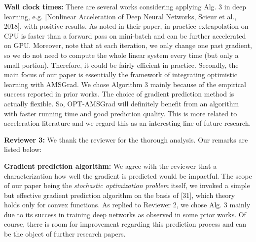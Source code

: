 \documentclass{article}
\begin{document}
\textbf{Wall clock times:}
There are several works considering applying Alg. 3 in deep learning, e.g. [Nonlinear Acceleration of Deep Neural Networks, Scieur et al., 2018], with positive results. As noted in their paper, in practice extrapolation on CPU is faster than a forward pass on mini-batch and can be further accelerated on GPU. Moreover, note that at each iteration, we only change one past gradient, so we do not need to compute the whole linear system every time (but only a small portion).  Therefore, it could be fairly efficient in practice. Secondly, the main focus of our paper is essentially the framework of integrating optimistic learning with AMSGrad. We chose Algorithm 3 mainly because of the empirical success reported in prior works. The choice of gradient prediction method is actually flexible. So, OPT-AMSGrad will definitely benefit from an algorithm with faster running time and good prediction quality. This is more related to acceleration literature and we regard this as an interesting line of future research.\vspace{-5pt}


\vspace{0.05in}
\textbf{\textcolor{green!50!black}{Reviewer 3:}} We thank the reviewer for the thorough analysis. Our remarks are listed below:\vspace{-5pt}

\textbf{Gradient prediction algorithm:}
We agree with the reviewer that a characterization how well the gradient is predicted would be impactful.
The scope of our paper being the \emph{stochastic optimization problem} itself, we invoked a simple but effective gradient prediction algorithm on the basis of [31], which theory holds only for convex functions. 
As replied to Reviewer 2, we chose Alg. 3 mainly due to its success in training deep networks as observed in some prior works.
Of course, there is room for improvement regarding this prediction process and can be the object of further research papers.\vspace{-5pt}

\end{document}
